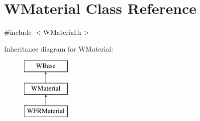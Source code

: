\hypertarget{class_w_material}{}\section{W\+Material Class Reference}
\label{class_w_material}


{\ttfamily \#include $<$W\+Material.\+h$>$}

Inheritance diagram for W\+Material\+:\begin{figure}[H]
\begin{center}
\leavevmode
\includegraphics[height=3.000000cm]{class_w_material}
\end{center}
\end{figure}
